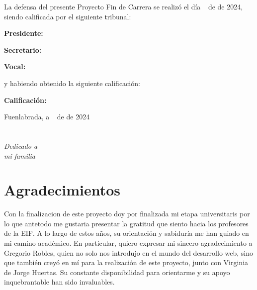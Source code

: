 \documentclass[a4paper, 12pt]{book}
\begin{document}
\vspace{1cm}
La defensa del presente Proyecto Fin de Carrera se realizó el día \qquad$\;\,$ de \qquad\qquad\qquad\qquad \newline de 2024, siendo calificada por el siguiente tribunal:


\vspace{0.5cm}
\textbf{Presidente:}

\vspace{1.2cm}
\textbf{Secretario:}

\vspace{1.2cm}
\textbf{Vocal:}


\vspace{1.2cm}
y habiendo obtenido la siguiente calificación:

\vspace{1cm}
\textbf{Calificación:}


\vspace{1cm}
\begin{flushright}
Fuenlabrada, a \qquad$\;\,$ de \qquad\qquad\qquad\qquad de 2024
\end{flushright}


\chapter*{}
\begin{flushright}
\textit{Dedicado a \\
mi familia}
\end{flushright}


\chapter*{Agradecimientos}

Con la finalizacion de este proyecto doy por finalizada mi etapa universitaris por lo que 
antetodo me gustaria presentar la gratitud que siento hacia los profesores de la EIF. A 
lo largo de estos años, su orientación y sabiduría me han guiado en mi camino académico. 
En particular, quiero expresar mi sincero agradecimiento a Gregorio Robles, quien no solo nos 
introdujo en el mundo del desarrollo web, sino que también creyó en mí para la realización de 
este proyecto, junto con Virginia de Jorge Huertas. Su constante disponibilidad para orientarme 
y su apoyo inquebrantable han sido invaluables.
\end{document}
